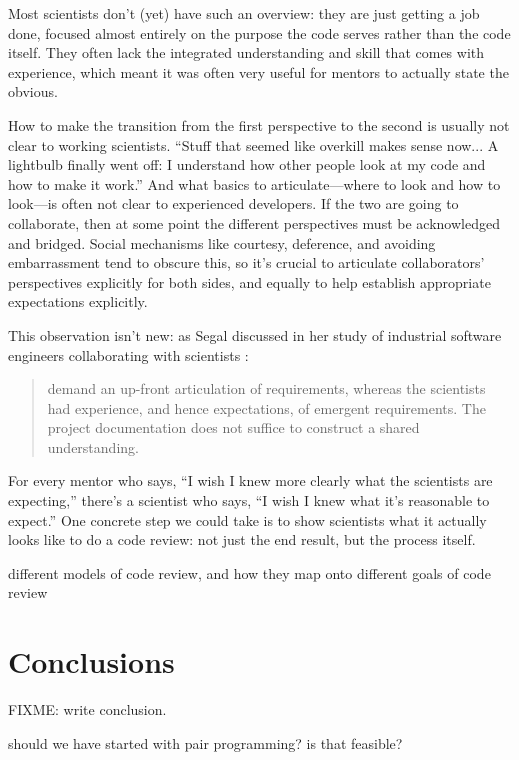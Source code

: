\documentclass[10pt,twocolumn]{article}
\begin{document}
Most scientists don't (yet) have such an overview:
they are just getting a job done,
focused almost entirely on the purpose the code serves rather than the code itself.
They often lack the integrated understanding and skill that comes with experience,
which meant it was often very useful for mentors to actually state the obvious.

How to make the transition from the first perspective to the second is usually not clear to working scientists.
``Stuff that seemed like overkill makes sense now...
A lightbulb finally went off:
I understand how other people look at my code and how to make it work.''
And what basics to articulate---where to look and how to look---is often not clear to experienced developers.
If the two are going to collaborate,
then at some point the different perspectives must be acknowledged and bridged.
Social mechanisms like courtesy, deference, and avoiding embarrassment tend to obscure this,
so it's crucial to articulate collaborators' perspectives explicitly for both sides,
and equally to help establish appropriate expectations explicitly.

This observation isn't new:
as Segal discussed in her study of industrial software engineers collaborating with scientists \cite{b:segal2005}:

\begin{quotation}
  \noindent
  [Programmers] demand an up-front articulation of requirements,
  whereas the scientists had experience, and hence expectations, of emergent requirements.
  The project documentation does not suffice to construct a shared understanding.
\end{quotation}

For every mentor who says,
``I wish I knew more clearly what the scientists are expecting,''
there's a scientist who says, ``I wish I knew what it's reasonable to expect.''
One concrete step we could take is to show scientists what it actually looks like to do a code review:
not just the end result,
but the process itself.

different models of code review, and how they map onto different goals of code review

\section{Conclusions}

FIXME: write conclusion.

should we have started with pair programming? is that feasible?
\end{document}
